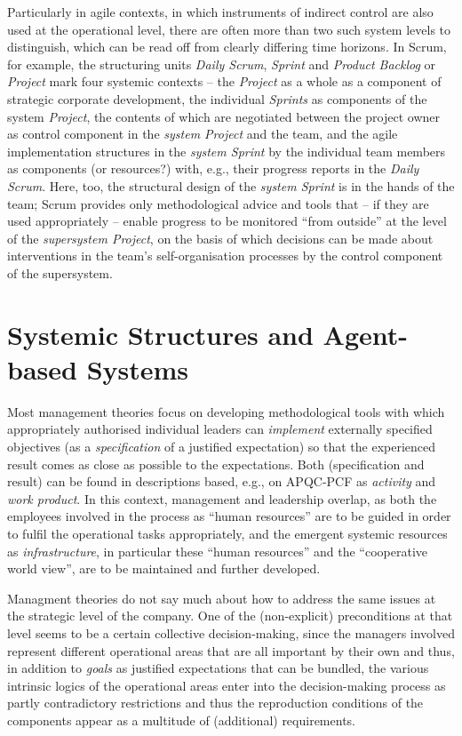 \documentclass[11pt,a4paper]{article}
\begin{document}
Particularly in agile contexts, in which instruments of indirect control are
also used at the operational level, there are often more than two such system
levels to distinguish, which can be read off from clearly differing time
horizons.  In Scrum, for example, the structuring units \emph{Daily Scrum},
\emph{Sprint} and \emph{Product Backlog} or \emph{Project} mark four systemic
contexts -- the \emph{Project} as a whole as a component of strategic
corporate development, the individual \emph{Sprints} as components of the
system \emph{Project}, the contents of which are negotiated between the
project owner as control component in the \emph{system Project} and the team,
and the agile implementation structures in the \emph{system Sprint} by the
individual team members as components (or resources?) with, e.g., their
progress reports in the \emph{Daily Scrum}. Here, too, the structural design
of the \emph{system Sprint} is in the hands of the team; Scrum provides only
methodological advice and tools that -- if they are used appropriately --
enable progress to be monitored \enquote{from outside} at the level of the
\emph{supersystem Project}, on the basis of which decisions can be made about
interventions in the team's self-organisation processes by the control
component of the supersystem.

\section{Systemic Structures and Agent-based Systems}

Most management theories focus on developing methodological tools with which
appropriately authorised individual leaders can \emph{implement} externally
specified objectives (as a \emph{specification} of a justified expectation) so
that the experienced result comes as close as possible to the expectations.
Both (specification and result) can be found in descriptions based, e.g., on
APQC-PCF as \emph{activity} and \emph{work product}. In this context,
management and leadership overlap, as both the employees involved in the
process as \enquote{human resources} are to be guided in order to fulfil the
operational tasks appropriately, and the emergent systemic resources as
\emph{infrastructure}, in particular these \enquote{human resources} and the
\enquote{cooperative world view}, are to be maintained and further developed.

Managment theories do not say much about how to address the same issues at the
strategic level of the company. One of the (non-explicit) preconditions at
that level seems to be a certain collective decision-making, since the
managers involved represent different operational areas that are all important
by their own and thus, in addition to \emph{goals} as justified expectations
that can be bundled, the various intrinsic logics of the operational areas
enter into the decision-making process as partly contradictory restrictions
and thus the reproduction conditions of the components appear as a multitude
of (additional) requirements.
\end{document}
